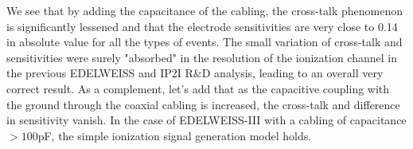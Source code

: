 We see that by adding the capacitance of the cabling, the cross-talk phenomenon is significantly lessened and that the electrode sensitivities are very close to 0.14 in absolute value for all the types of events. The small variation of cross-talk and sensitivities were surely "absorbed" in the resolution of the ionization channel in the previous EDELWEISS and IP2I R\&D analysis, leading to an overall very correct result. As a complement, let's add that as the capacitive coupling with the ground through the coaxial cabling is increased, the cross-talk and difference in sensitivity vanish. In the case of EDELWEISS-III with a cabling of capacitance $>100$pF, the simple ionization signal generation model holds.




%
%
%
%
%
%
